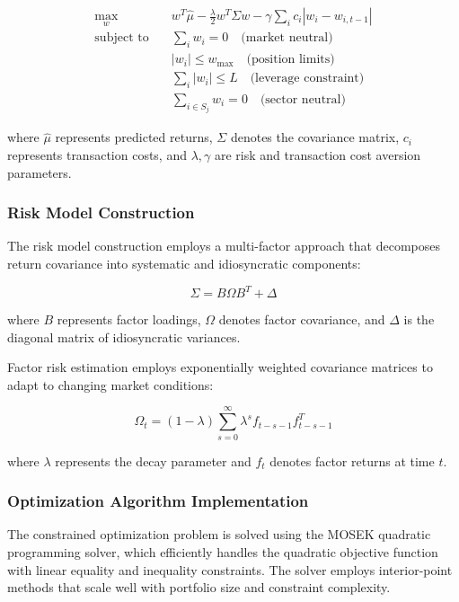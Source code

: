 \documentclass[conference]{IEEEtran}
\begin{document}
\begin{align}
\max_{w} \quad & w^T \hat{\mu} - \frac{\lambda}{2} w^T \Sigma w - \gamma \sum_i c_i |w_i - w_{i,t-1}| \\
\text{subject to} \quad & \sum_i w_i = 0 \quad \text{(market neutral)} \\
& |w_i| \leq w_{\max} \quad \text{(position limits)} \\
& \sum_i |w_i| \leq L \quad \text{(leverage constraint)} \\
& \sum_{i \in S_j} w_i = 0 \quad \text{(sector neutral)}
\end{align}

where $\hat{\mu}$ represents predicted returns, $\Sigma$ denotes the covariance matrix, $c_i$ represents transaction costs, and $\lambda, \gamma$ are risk and transaction cost aversion parameters.

\subsubsection{Risk Model Construction}

The risk model construction employs a multi-factor approach that decomposes return covariance into systematic and idiosyncratic components:

\begin{equation}
\Sigma = B \Omega B^T + \Delta
\end{equation}

where $B$ represents factor loadings, $\Omega$ denotes factor covariance, and $\Delta$ is the diagonal matrix of idiosyncratic variances.

Factor risk estimation employs exponentially weighted covariance matrices to adapt to changing market conditions:

\begin{equation}
\Omega_t = (1-\lambda) \sum_{s=0}^{\infty} \lambda^s f_{t-s-1} f_{t-s-1}^T
\end{equation}

where $\lambda$ represents the decay parameter and $f_t$ denotes factor returns at time $t$.

\subsubsection{Optimization Algorithm Implementation}

The constrained optimization problem is solved using the MOSEK quadratic programming solver, which efficiently handles the quadratic objective function with linear equality and inequality constraints. The solver employs interior-point methods that scale well with portfolio size and constraint complexity.
\end{document}
